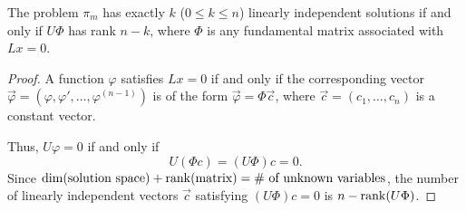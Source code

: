 \documentclass[11pt, oneside, a4paper]{article}
\begin{document}
\begin{thm}\label{thm:exactly k l.i.d solutions iff rank n-k}
    The problem $\pi_m$ has exactly $k$ ($0\leq k\leq n$) linearly independent solutions if and only if $U\Phi$ has rank $n-k$, where $\Phi$ is any fundamental matrix associated with $Lx=0$.
\end{thm}
\begin{proof}
    A function $\varphi$ satisfies $Lx=0$ if and only if the corresponding vector $\vec{\varphi}=(\varphi, \varphi', \ldots, \varphi^{(n-1)})$ is of the form $\vec{\varphi}=\Phi \vec{c}$, where $\vec{c}=(c_1,\ldots, c_n)$ is a constant vector.

    Thus, $U\varphi=0$ if and only if
    \[U(\Phi c) = (U\Phi)c = 0.\]
    Since $\dim(\text{solution space}) + \operatorname{rank}(\text{matrix}) = \text{$\#$ of unknown variables}$, the number of linearly independent vectors $\vec{c}$ satisfying $(U\Phi)c=0$ is $n-\operatorname{rank}(U\Phi)$. 
    

\end{proof}
\end{document}
